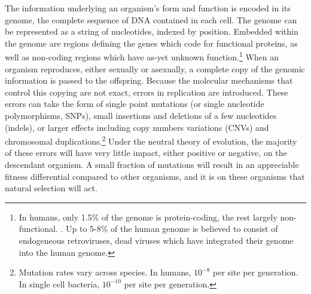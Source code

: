 The information underlying an organism's form and function is encoded in its genome, the complete sequence of DNA contained in each cell.
The genome can be represented as a string of nucleotides, indexed by position.
Embedded within the genome are regions defining the genes which code for functional proteins, as well as non-coding regions which have as-yet unknown function.\footnote{In humans, only 1.5\% of the genome is protein-coding, the rest largely non-functional. \cite{Lander:2001hk}. Up to 5-8\% of the human genome is believed to consist of endogeneous retroviruses, dead viruses which have integrated their genome into the human genome.}
When an organism reproduces, either sexually or asexually, a complete copy of the genomic information is passed to the offspring.
Because the molecular mechanisms that control this copying are not exact, errors in replication are introduced.
These errors can take the form of single point mutations (or single nucleotide polymorphisms, SNPs), small insertions and deletions of a few nucleotides (indels), or larger effects including copy numbers variations (CNVs) and chromosomal duplications.\footnote{Mutation rates vary across species. In humans, $10^{-8}$ per site per generation. In single cell bacteria, $10^{-10}$ per site per generation.}
Under the neutral theory of evolution, the majority of these errors will have very little impact, either positive or negative, on the descendant organism.
A small fraction of mutations will result in an appreciable fitness differential compared to other organisms, and it is on these organisms that natural selection will act.

